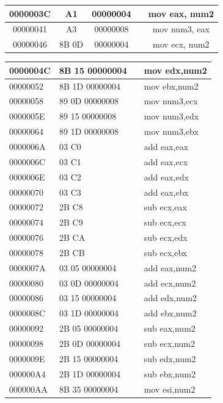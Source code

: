 \documentclass[10pt]{book}
\begin{document}
\begin{center}
\begin{tabular}{|c|c|c|c|c|}
\hline
0000003C & A1 & 00000004 &  & mov eax, num2 \\
\hline
00000041 & A3 & 00000008 &  & mov num3, eax \\
\hline
00000046 & 8B 0D & 00000004 &  & mov ecx, num2 \\
\hline
\end{tabular}
\end{center}
\begin{center}
\begin{tabular}{|l|l|l|l|}
\hline
0000004C & 8B 15 00000004 &  & mov edx,num2 \\
\hline
00000052 & 8B 1D 00000004 &  & mov ebx,num2 \\
\hline
00000058 & 89 0D 00000008 &  & mov num3,ecx \\
\hline
0000005E & 89 15 00000008 &  & mov num3,edx \\
\hline
00000064 & 89 1D 00000008 &  & mov num3,ebx \\
\hline
0000006A & 03 C0 &  & add eax,eax \\
\hline
0000006C & 03 C1 &  & add eax,ecx \\
\hline
0000006E & 03 C2 &  & add eax,edx \\
\hline
00000070 & 03 C3 &  & add eax,ebx \\
\hline
00000072 & 2B C8 &  & sub ecx,eax \\
\hline
00000074 & 2B C9 &  & sub ecx,ecx \\
\hline
00000076 & 2B CA &  & sub ecx,edx \\
\hline
00000078 & 2B CB &  & sub ecx,ebx \\
\hline
0000007A & 03 05 00000004 &  & add eax,num2 \\
\hline
00000080 & 03 0D 00000004 &  & add ecx,num2 \\
\hline
00000086 & 03 15 00000004 &  & add edx,num2 \\
\hline
0000008C & 03 1D 00000004 &  & add ebx,num2 \\
\hline
00000092 & 2B 05 00000004 &  & sub eax,num2 \\
\hline
00000098 & 2B 0D 00000004 &  & sub ecx,num2 \\
\hline
0000009E & 2B 15 00000004 &  & sub edx,num2 \\
\hline
000000A4 & 2B 1D 00000004 &  & sub ebx,num2 \\
\hline
000000AA & 8B 35 00000004 &  & mov esi,num2 \\

\end{tabular}
\end{center}
\end{document}
